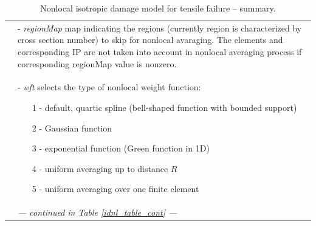 \documentclass[a4paper]{article}
\newcommand{\param}[1]{{\it #1}}
\begin{document}
\begin{table}[!htb]
\begin{tabular}{|l|p{9cm}|}
&- \param{regionMap} map indicating the regions (currently region is
characterized by cross section number) to skip for nonlocal
avaraging. The elements and corresponding IP are not taken into
account in nonlocal averaging process if corresponding regionMap
value is nonzero.\\
&- \param{wft} selects the type of nonlocal weight function:
\begin{itemize}\setlength{\itemsep}{-3pt}
\item[1 -] default, quartic spline (bell-shaped function with bounded support)
\item[2 -] Gaussian function
\item[3 -] exponential function (Green function in 1D)
\item[4 -] uniform averaging up to distance $R$
\item[5 -] uniform averaging over one finite element
\end{itemize}\\
& {\it --- continued in Table \ref{idnl_table_cont} ---} \\
\hline
\end{tabular}
\caption{Nonlocal isotropic damage model for tensile failure -- summary.}
\label{idnl_table}
\end{table}
\end{document}
